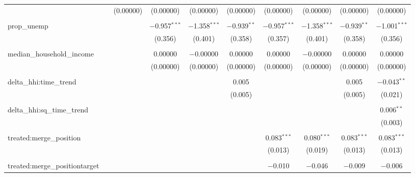 \begin{table}[H]
{\begin{tabular}{@{\extracolsep{5pt}}lccccccccc}
   &  & (0.00000) & (0.00000) & (0.00000) & (0.00000) & (0.00000) & (0.00000) & (0.00000) & (0.00000) \\  

   & & & & & & & & & \\  

  prop\_unemp &  &  & $-$0.957$^{***}$ & $-$1.358$^{***}$ & $-$0.939$^{**}$ & $-$0.957$^{***}$ & $-$1.358$^{***}$ & $-$0.939$^{**}$ & $-$1.001$^{***}$ \\  

   &  &  & (0.356) & (0.401) & (0.358) & (0.357) & (0.401) & (0.358) & (0.356) \\  

   & & & & & & & & & \\  

  median\_household\_income &  &  & 0.00000 & $-$0.00000 & 0.00000 & 0.00000 & $-$0.00000 & 0.00000 & 0.00000 \\  

   &  &  & (0.00000) & (0.00000) & (0.00000) & (0.00000) & (0.00000) & (0.00000) & (0.00000) \\  

   & & & & & & & & & \\  

  delta\_hhi:time\_trend &  &  &  &  & 0.005 &  &  & 0.005 & $-$0.043$^{**}$ \\  

   &  &  &  &  & (0.005) &  &  & (0.005) & (0.021) \\  

   & & & & & & & & & \\  

  delta\_hhi:sq\_time\_trend &  &  &  &  &  &  &  &  & 0.006$^{**}$ \\  

   &  &  &  &  &  &  &  &  & (0.003) \\  

   & & & & & & & & & \\  

  treated:merge\_position &  &  &  &  &  & 0.083$^{***}$ & 0.080$^{***}$ & 0.083$^{***}$ & 0.083$^{***}$ \\  

   &  &  &  &  &  & (0.013) & (0.019) & (0.013) & (0.013) \\  

   & & & & & & & & & \\  

  treated:merge\_positiontarget &  &  &  &  &  & $-$0.010 & $-$0.046 & $-$0.009 & $-$0.006 \\  


\end{tabular}}
\end{table}
